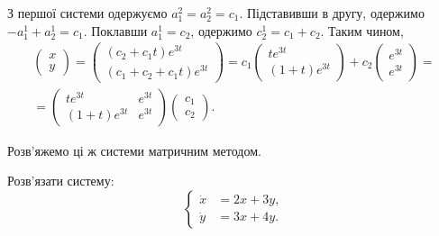 \begin{solution}
    З першої системи одержуємо $a_1^2 = a_2^2 = c_1$. Підставивши в другу, одержимо $-a_1^1 + a_2^1 = c_1$. Поклавши $a_1^1 = c_2$, одержимо $c_2^1 = c_1 + c_2$. Таким чином,
    \begin{multline*} \begin{pmatrix} x \\ y \end{pmatrix} = \begin{pmatrix} (c_2 + c_1 t) e^{3 t} \\ (c_1 + c_2 + c_1 t) e^{3 t} \end{pmatrix} = c_1 \begin{pmatrix} t e^{3 t} \\ (1 + t) e^{3 t} \end{pmatrix} + c_2 \begin{pmatrix} e^{3 t} \\ e^{3 t} \end{pmatrix} = \\ = \begin{pmatrix} t e^{3 t} & e^{3 t} \\ (1 + t) e^{3 t} & e^{3 t} \end{pmatrix} \begin{pmatrix} c_1 \\ c_2 \end{pmatrix}. \end{multline*}
\end{solution}

Розв'яжемо ці ж системи матричним методом.

\setcounter{problem}{0}
\begin{example}
    Розв'язати систему:
    \[ \left\{ \begin{aligned}
        \dot x &= 2 x + 3 y, \\
        \dot y &= 3 x + 4 y.
    \end{aligned} \right. \]
\end{example}


